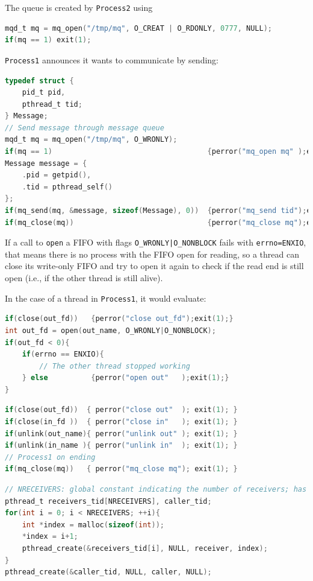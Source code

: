 \documentclass{sope}
\begin{document}
{
The queue is created by \texttt{Process2} using
\begin{lstlisting}[language=C,basicstyle=\ttfamily\small]
mqd_t mq = mq_open("/tmp/mq", O_CREAT | O_RDONLY, 0777, NULL);
if(mq == 1) exit(1);
\end{lstlisting}
\texttt{Process1} announces it wants to communicate by sending:
\begin{lstlisting}[language=C,basicstyle=\ttfamily\small]
typedef struct {
    pid_t pid,
    pthread_t tid;
} Message;
// Send message through message queue
mqd_t mq = mq_open("/tmp/mq", O_WRONLY);
if(mq == 1)                                    {perror("mq_open mq" );exit(1);}
Message message = {
    .pid = getpid(),
    .tid = pthread_self()
};
if(mq_send(mq, &message, sizeof(Message), 0))  {perror("mq_send tid");exit(1);}
if(mq_close(mq))                               {perror("mq_close mq");exit(1);}
\end{lstlisting}

If a call to \texttt{open} a FIFO with flags \texttt{O\_WRONLY|O\_NONBLOCK} fails with \texttt{errno=ENXIO}, that means there is no process with the FIFO open for reading, so a thread can close its write-only FIFO and try to open it again to check if the read end is still open (i.e., if the other thread is still alive).

In the case of a thread in \texttt{Process1}, it would evaluate:
\begin{lstlisting}[language=C,basicstyle=\ttfamily\small]
if(close(out_fd))   {perror("close out_fd");exit(1);}
int out_fd = open(out_name, O_WRONLY|O_NONBLOCK);
if(out_fd < 0){
    if(errno == ENXIO){
        // The other thread stopped working
    } else          {perror("open out"   );exit(1);}
}
\end{lstlisting}

\begin{lstlisting}[language=C,basicstyle=\ttfamily\small]
if(close(out_fd))  { perror("close out"  ); exit(1); }
if(close(in_fd ))  { perror("close in"   ); exit(1); }
if(unlink(out_name){ perror("unlink out" ); exit(1); }
if(unlink(in_name ){ perror("unlink in"  ); exit(1); }
// Process1 on ending
if(mq_close(mq))   { perror("mq_close mq"); exit(1); }
\end{lstlisting}

\newpage
\begin{lstlisting}[language=C,basicstyle=\ttfamily\small]
// NRECEIVERS: global constant indicating the number of receivers; has value 10
pthread_t receivers_tid[NRECEIVERS], caller_tid;
for(int i = 0; i < NRECEIVERS; ++i){
    int *index = malloc(sizeof(int));
    *index = i+1;
    pthread_create(&receivers_tid[i], NULL, receiver, index);
}
pthread_create(&caller_tid, NULL, caller, NULL);
\end{lstlisting}

}
\end{document}
